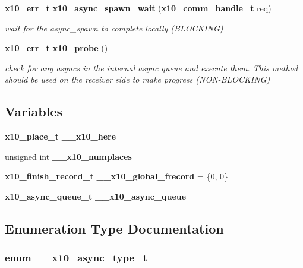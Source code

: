 \begin{CompactItemize}
{\bf x10\_\-err\_\-t} {\bf x10\_\-async\_\-spawn\_\-wait} ({\bf x10\_\-comm\_\-handle\_\-t} req)
\begin{CompactList}\small\item\em wait for the async\_\-spawn to complete locally (BLOCKING) \item\end{CompactList}\item 
{\bf x10\_\-err\_\-t} {\bf x10\_\-probe} ()
\begin{CompactList}\small\item\em check for any asyncs in the internal async queue and execute them. This method should be used on the receiver side to make progress (NON-BLOCKING) \item\end{CompactList}\end{CompactItemize}
\subsection*{Variables}
\begin{CompactItemize}
\item 
{\bf x10\_\-place\_\-t} {\bf \_\-\_\-x10\_\-here}
\item 
unsigned int {\bf \_\-\_\-x10\_\-numplaces}
\item 
{\bf x10\_\-finish\_\-record\_\-t} {\bf \_\-\_\-x10\_\-global\_\-frecord} = \{0, 0\}
\item 
{\bf x10\_\-async\_\-queue\_\-t} {\bf \_\-\_\-x10\_\-async\_\-queue}
\end{CompactItemize}


\subsection{Enumeration Type Documentation}
\subsubsection{\setlength{\rightskip}{0pt plus 5cm}enum {\bf \_\-\_\-x10\_\-async\_\-type\_\-t}}\label{async_8cc_a20}


